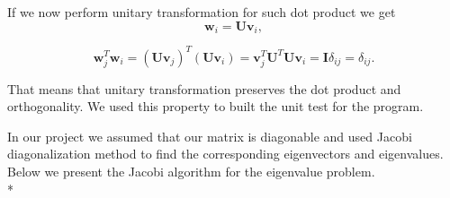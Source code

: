 \documentclass[10pt]{article}
\begin{document}
If we now perform unitary transformation for such dot product we get
\begin{equation}
\mathbf{w}_i=\mathbf{U}\mathbf{v}_i,
\end{equation}


\begin{equation}
\mathbf{w}_j^T\mathbf{w}_i=(\mathbf{U}\mathbf{v}_j)^T(\mathbf{U}\mathbf{v}_i)=\mathbf{v}_j^T\mathbf{U}^T\mathbf{U}\mathbf{v}_i=\mathbf{I}\delta_{ij}=\delta_{ij}.
\end{equation}


That means that unitary transformation preserves the dot product and orthogonality. We used this property to built the unit test for the program.


In our project we assumed that our matrix is diagonable and used Jacobi diagonalization method to find the corresponding eigenvectors and eigenvalues. Below we present the Jacobi algorithm for the eigenvalue problem. 
\\*
\end{document}
